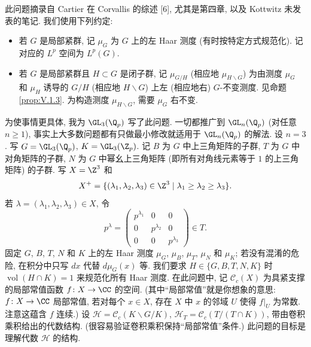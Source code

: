 此问题摘录自 Cartier 在 Corvallis 的综述 {[}6{]}, 尤其是第四章, 以及 Kottwitz 未发表的笔记.
我们使用下列约定:
\begin{itemize}
\item 若 $G$ 是局部紧群, 记 $\mu_G$ 为 $G$ 上的左 Haar 测度 (有时按特定方式规范化). 记对应的 $L^p$ 空间为 $L^p(G)$.
\item 若 $G$ 是局部紧群且 $H \subset G$ 是闭子群, 记 $\mu_{G/H}$ (相应地 $\mu_{H\backslash G}$) 为由测度 $\mu_G$ 和 $\mu_H$ 诱导的 $G/H$ (相应地 $H\backslash G$) 上左 (相应地右) $G$-不变测度. 见命题 \ref{prop:V.1.3}. 为构造测度 $\mu_{H\backslash G}$, 需要 $\mu_G$ 右不变.
\end{itemize}
为使事情更具体, 我为 $\GL_3(\Q_p)$ 写了此问题. 一切都推广到 $\GL_n(\Q_p)$ (对任意 $n \geq 1$), 事实上大多数问题都有只做最小修改就适用于 $\GL_n(\Q_p)$ 的解法.
设 $n = 3$. 写 $G = \GL_3(\Q_p)$, $K = \GL_3(\Z_p)$. 记 $B$ 为 $G$ 中上三角矩阵的子群, $T$ 为 $G$ 中对角矩阵的子群, $N$ 为 $G$ 中幂幺上三角矩阵 (即所有对角线元素等于 $1$ 的上三角矩阵) 的子群. 写 $X = \Z^3$ 和
\[
X^+ = \{(\lambda_1, \lambda_2, \lambda_3) \in \Z^3 \mid \lambda_1 \geq \lambda_2 \geq \lambda_3\}.
\]
若 $\lambda = (\lambda_1, \lambda_2, \lambda_3) \in X$, 令
\[
p^{\lambda} = \begin{pmatrix} p^{\lambda_1} & 0 & 0 \\ 0 & p^{\lambda_2} & 0 \\ 0 & 0 & p^{\lambda_3} \end{pmatrix} \in T.
\]
固定 $G$, $B$, $T$, $N$ 和 $K$ 上的左 Haar 测度 $\mu_G$, $\mu_B$, $\mu_T$, $\mu_N$ 和 $\mu_K$; 若没有混淆的危险, 在积分中只写 $dx$ 代替 $d\mu_G(x)$ 等. 我们要求 $H \in \{G, B, T, N, K\}$ 时 $\operatorname{vol}(H \cap K) = 1$ 来规范化所有 Haar 测度. 在此问题中, 记 $\mathcal{C}_c(X)$ 为具紧支撑的局部常值函数 $f \colon X \to \CC$ 的空间. (其中``局部常值''就是你想象的意思: $f \colon X \to \CC$ 局部常值, 若对每个 $x \in X$, 存在 $X$ 中 $x$ 的邻域 $U$ 使得 $f|_U$ 为常数. 注意这蕴含 $f$ 连续.)
设 $\mathcal{H} = \mathcal{C}_c(K\backslash G/K)$, $\mathcal{H}_T = \mathcal{C}_c(T/(T \cap K))$, 带由卷积乘积给出的代数结构. (很容易验证卷积乘积保持``局部常值''条件.) 此问题的目标是理解代数 $\mathcal{H}$ 的结构.
